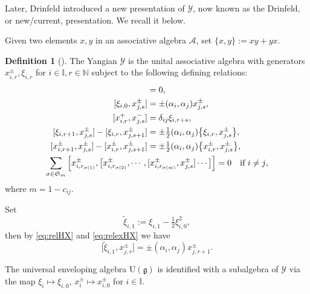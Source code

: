 \documentclass[11pt,reqno]{amsart}
\numberwithin{equation}{section}
\theoremstyle{definition}
\newtheorem{dfn}[thm]{Definition}
\theoremstyle{remark}
\newcommand{\beq}{\begin{equation}}
\newcommand{\eeq}{\end{equation}}
\newcommand{\bN}{\mathbb{N}}
\newcommand{\g}{\mathfrak{g}}
\newcommand{\fkS}{\mathfrak{S}}
\newcommand{\tl}{\tilde}
\newcommand{\I}{{\mathbb I}}
\newcommand{\Y}{{\mathscr{Y}}}
\begin{document}
Later, Drinfeld introduced a new presentation of $\Y$, now known as the Drinfeld, or new/current, presentation. We recall it below.

Given two elements $x,y$ in an associative algebra $\mathcal A$, set $\{x,y\}:=xy+yx$.

\begin{dfn}[\cite{Dri87}]
\label{def:Yangian}The Yangian $\Y$ is the unital associative algebra with generators $x_{i
  ,r}^\pm,\xi_{i,r}$ for $i\in \I, r\in\bN$ subject to the following
defining relations: 
\begin{align}
  [\xi_{i,r}, \xi_{j,s}]& = 0, \notag\\
  [\xi_{i,0}, x^\pm_{j,s} ]& = \pm (\alpha_i,\alpha_j) x^\pm_{j,s},
  \label{eq:relHX}
\\
  [x^+_{i,r}, x_{j,s}^-]& = \delta_{ij} \xi_{i, r+s}, \label{eq:relXX}
\\
  [\xi_{i, r+1}, x^\pm_{j,s}] - [\xi_{i,r}, x^\pm_{j, s+1}]& =
  \pm\tfrac12(\alpha_i,\alpha_j) \big\{
    \xi_{i,r},x^\pm_{j,s}
  \big\}, \label{eq:relexHX}
\\
  [x^\pm_{i, r+1}, x^\pm_{j, s}] - [x^\pm_{i, r}, x^\pm_{j, s+1}] &= 
  \pm\tfrac12(\alpha_i,\alpha_j) \big\{
    x^\pm_{i,r},x^\pm_{j,s}\big\},
   \label{eq:relexXX}
\\
  \sum_{\sigma\in \fkS_m}
   \Big[x^\pm_{i, r_{\sigma(1)}}, \big[ x^\pm_{i, r_{\sigma(2)}}, \cdots,\,
       &[x^\pm_{i, r_{\sigma(m)}}, x^\pm_{j, s}] \cdots \big]\Big]
   = 0
   \quad \text{if $i\neq j$,}
 \notag
\end{align}
where $m = 1 - c_{ij}$.
\end{dfn}

Set
\beq\label{tlxidef}
\tl \xi_{i,1}:=\xi_{i,1}-\tfrac12\xi_{i,0}^2,
\eeq 
then by \eqref{eq:relHX} and \eqref{eq:relexHX} we have
\beq\label{tlxicom}
\big[\tl \xi_{i,1},x_{j,r}^\pm\big]=\pm(\alpha_i,\alpha_j)x_{j,r+1}^\pm.
\eeq 

The universal enveloping algebra $\mathrm{U}(\g)$ is identified with a subalgebra of $\Y$ via the map $\xi_i\mapsto \xi_{i,0}$, $x_i^{\pm}\mapsto x_{i,0}^\pm$ for $i\in\I$. 
\end{document}
